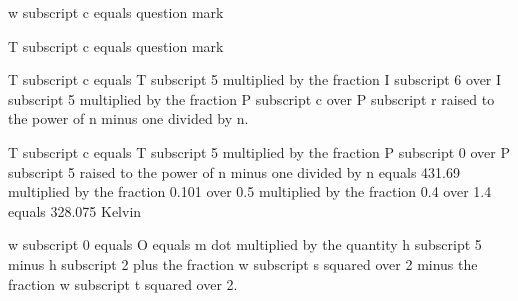 w subscript c equals question mark

T subscript c equals question mark

T subscript c equals T subscript 5 multiplied by the fraction I subscript 6 over I subscript 5 multiplied by the fraction P subscript c over P subscript r raised to the power of n minus one divided by n.

T subscript c equals T subscript 5 multiplied by the fraction P subscript 0 over P subscript 5 raised to the power of n minus one divided by n equals 431.69 multiplied by the fraction 0.101 over 0.5 multiplied by the fraction 0.4 over 1.4 equals 328.075 Kelvin

w subscript 0 equals O equals m dot multiplied by the quantity h subscript 5 minus h subscript 2 plus the fraction w subscript s squared over 2 minus the fraction w subscript t squared over 2.